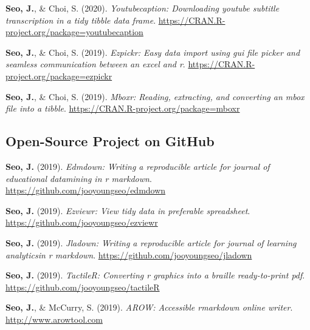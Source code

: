 \documentclass[11pt, a4paper]{awesome-cv}
\begin{document}
\begingroup
\setlength{\parindent}{-0.5in}
\setlength{\leftskip}{0.5in}

\hypertarget{refs_R_packages}{}
\leavevmode\hypertarget{ref-R-youtubecaption}{}%
\textbf{Seo, J.}, \& Choi, S. (2020). \emph{Youtubecaption: Downloading youtube subtitle transcription in a tidy tibble data frame}. \url{https://CRAN.R-project.org/package=youtubecaption}

\leavevmode\hypertarget{ref-R-ezpickr}{}%
\textbf{Seo, J.}, \& Choi, S. (2019). \emph{Ezpickr: Easy data import using gui file picker and seamless communication between an excel and r}. \url{https://CRAN.R-project.org/package=ezpickr}

\leavevmode\hypertarget{ref-R-mboxr}{}%
\textbf{Seo, J.}, \& Choi, S. (2019). \emph{Mboxr: Reading, extracting, and converting an mbox file into a tibble}. \url{https://CRAN.R-project.org/package=mboxr}

\endgroup

\hypertarget{open-source-project-on-github}{%
\subsection{Open-Source Project on GitHub}\label{open-source-project-on-github}}

\begingroup
\setlength{\parindent}{-0.5in}
\setlength{\leftskip}{0.5in}

\hypertarget{refs_github_projects}{}
\leavevmode\hypertarget{ref-R-edmdown}{}%
\textbf{Seo, J.} (2019). \emph{Edmdown: Writing a reproducible article for journal of educational datamining in r markdown}. \url{https://github.com/jooyoungseo/edmdown}

\leavevmode\hypertarget{ref-R-ezviewr}{}%
\textbf{Seo, J.} (2019). \emph{Ezviewr: View tidy data in preferable spreadsheet}. \url{https://github.com/jooyoungseo/ezviewr}

\leavevmode\hypertarget{ref-R-jladown}{}%
\textbf{Seo, J.} (2019). \emph{Jladown: Writing a reproducible article for journal of learning analyticsin r markdown}. \url{https://github.com/jooyoungseo/jladown}

\leavevmode\hypertarget{ref-R-tactileR}{}%
\textbf{Seo, J.} (2019). \emph{TactileR: Converting r graphics into a braille ready-to-print pdf}. \url{https://github.com/jooyoungseo/tactileR}

\leavevmode\hypertarget{ref-webrender}{}%
\textbf{Seo, J.}, \& McCurry, S. (2019). \emph{AROW: Accessible rmarkdown online writer}. \url{http://www.arowtool.com}
\end{document}
